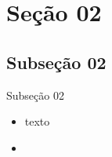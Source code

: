 

\section{Seção 02}

\subsection[]{Subseção 02}

\begin{frame}{Subseção 02}
	\begin{itemize}[<+->]
		\item texto
		\item 
	\end{itemize}
\end{frame}


